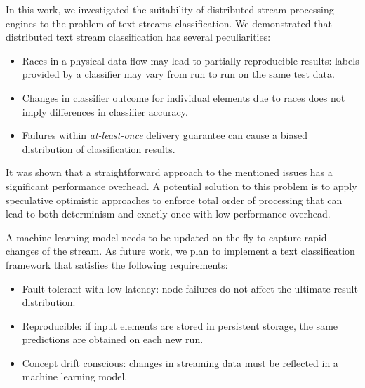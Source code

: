 \label {fs-conclusion}

In this work, we investigated the suitability of distributed stream processing engines to the problem of text streams classification. We demonstrated that distributed text stream classification has several peculiarities:

\begin{itemize}
    \item Races in a physical data flow may lead to partially reproducible results: labels provided by a classifier may vary from run to run on the same test data.
    \item Changes in classifier outcome for individual elements due to races does not imply differences in classifier accuracy. 
    \item Failures within {\em at-least-once} delivery guarantee can cause a biased distribution of classification results.
\end{itemize}

It was shown that a straightforward approach to the mentioned issues has a significant performance overhead. A potential solution to this problem is to apply speculative optimistic approaches to enforce total order of processing that can lead to both determinism and exactly-once with low performance overhead. 

A machine learning model needs to be updated on-the-fly to capture rapid changes of the stream. As future work, we plan to implement a text classification framework that satisfies the following requirements:

\begin{itemize}
    \item Fault-tolerant with low latency: node failures do not affect the ultimate result distribution.
    \item Reproducible: if input elements are stored in persistent storage, the same predictions are obtained on each new run.
    \item Concept drift conscious: changes in streaming data must be reflected in a machine learning model.  
\end{itemize}